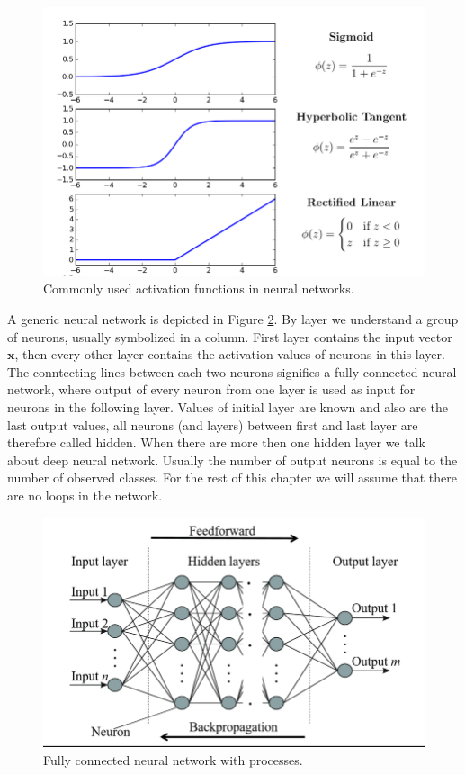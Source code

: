 \begin{figure}[hbtp]
    \centering
    \includegraphics[scale=0.4]{obrazky/Common-neural-network-activation-functions.png}

    \caption{Commonly used activation functions in neural networks.\cite[altered]{activation}}
    \label{img:actfunc}
\end{figure} 
A generic neural network is depicted in Figure \ref*{img:fullyNN}.  By layer we understand a group of neurons, usually symbolized in a column. First layer contains the input vector $\bm{x}$, then every other layer contains the activation values of neurons in this layer. The conntecting lines between each two neurons signifies a fully connected neural network, where  output of every neuron from one layer is used as input for neurons in the following layer. Values of initial layer are known and also are the last output values, all neurons (and layers) between first and last layer are therefore called hidden. When there are more then one hidden layer we talk about deep neural network. Usually the number of output neurons is equal to the number of observed classes. For the rest of this chapter we will assume that there are no loops in the network.\cite{DIP}

\begin{figure}[hbtp]
    \centering
    \includegraphics[scale=0.4]{obrazky/fullyNN.png}

    \caption{Fully connected neural network with processes.\cite{nn1}}
    \label{img:fullyNN}
\end{figure}


